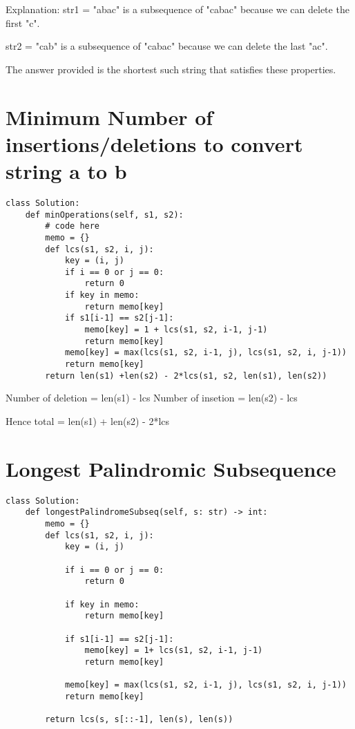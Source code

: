 \documentclass[24pt, a4]{article}
\begin{document}
Explanation: 
str1 = "abac" is a subsequence of "cabac" because we can delete the first "c".

str2 = "cab" is a subsequence of "cabac" because we can delete the last "ac".

The answer provided is the shortest such string that satisfies these properties.

\newpage
\section{Minimum Number of insertions/deletions to convert string a to b}
\begin{lstlisting}
class Solution:
    def minOperations(self, s1, s2):
        # code here
        memo = {}
        def lcs(s1, s2, i, j):
            key = (i, j)
            if i == 0 or j == 0:
                return 0
            if key in memo:
                return memo[key]
            if s1[i-1] == s2[j-1]:
                memo[key] = 1 + lcs(s1, s2, i-1, j-1)
                return memo[key]
            memo[key] = max(lcs(s1, s2, i-1, j), lcs(s1, s2, i, j-1))
            return memo[key]
        return len(s1) +len(s2) - 2*lcs(s1, s2, len(s1), len(s2))
\end{lstlisting}

Number of deletion = len(s1) - lcs
Number of insetion = len(s2) - lcs

Hence total = len(s1) + len(s2) - 2*lcs

\newpage
\section{Longest Palindromic Subsequence}
\begin{lstlisting}
class Solution:
    def longestPalindromeSubseq(self, s: str) -> int:
        memo = {}
        def lcs(s1, s2, i, j):
            key = (i, j)
            
            if i == 0 or j == 0:
                return 0
            
            if key in memo:
                return memo[key]
            
            if s1[i-1] == s2[j-1]:
                memo[key] = 1+ lcs(s1, s2, i-1, j-1)
                return memo[key]
            
            memo[key] = max(lcs(s1, s2, i-1, j), lcs(s1, s2, i, j-1))
            return memo[key]
        
        return lcs(s, s[::-1], len(s), len(s))
\end{lstlisting}
\end{document}
